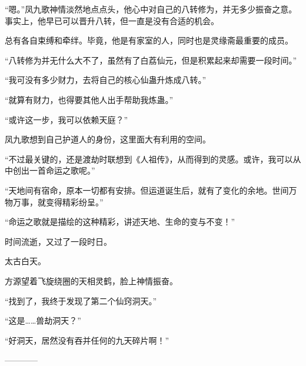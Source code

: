 \begin{this_body}
“嗯。”凤九歌神情淡然地点点头，他心中对自己的八转修为，并无多少振奋之意。事实上，他早已可以晋升八转，但一直是没有合适的机会。

总有各自束缚和牵绊。毕竟，他是有家室的人，同时也是灵缘斋最重要的成员。

“八转修为并无什么大不了，虽然有了白荔仙元，但是积累起来却需要一段时间。”

“我可没有多少财力，去将自己的核心仙蛊升炼成八转。”

“就算有财力，也得要其他人出手帮助我炼蛊。”

“或许这一步，我可以依赖天庭？”

凤九歌想到自己护道人的身份，这里面大有利用的空间。

“不过最关键的，还是渡劫时联想到《人祖传》，从而得到的灵感。或许，我可以从中创出一首命运之歌呢。”

“天地间有宿命，原本一切都有安排。但运道诞生后，就有了变化的余地。世间万物万事，就变得精彩纷呈。”

“命运之歌就是描绘的这种精彩，讲述天地、生命的变与不变！”

时间流逝，又过了一段时日。

太古白天。

方源望着飞旋绕圈的天相灵鹤，脸上神情振奋。

“找到了，我终于发现了第二个仙窍洞天。”

“这是……兽劫洞天？”

“好洞天，居然没有吞并任何的九天碎片啊！”

------------

\end{this_body}

